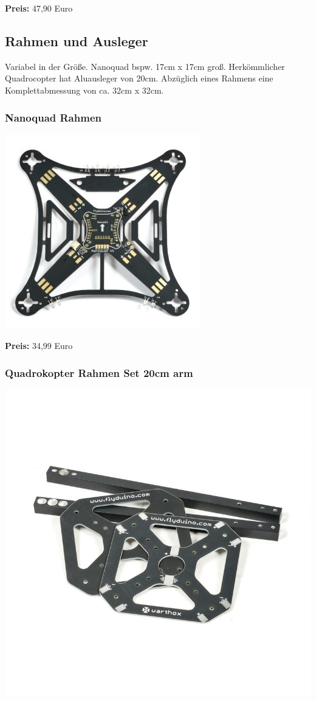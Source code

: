 \documentclass[12pt,a4paper]{article}
\begin{document}
\textbf{Preis:} 47,90 Euro

\subsection*{Rahmen und Ausleger}
Variabel in der Größe. Nanoquad bspw. 17cm x 17cm groß. Herkömmlicher Quadrocopter hat Aluausleger von 20cm. Abzüglich eines Rahmens eine Komplettabmessung von ca. 32cm x 32cm. 

\subsubsection*{Nanoquad Rahmen}
\includegraphics[scale=0.5]{Bilder/Nanoquad-Rahmen.jpg}

\textbf{Preis:} 34,99 Euro

\subsubsection*{Quadrokopter Rahmen Set 20cm arm}
\includegraphics[scale=0.4]{Bilder/Quadrokopter-Rahmen.jpg}
\end{document}
